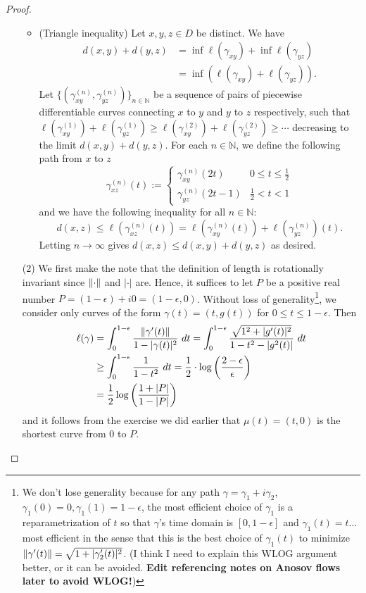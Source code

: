 \documentclass[10pt]{article}
\theoremstyle{plain}
\begin{document}
\begin{proof}
\begin{itemize}
\begin{itemize}
						\item (Triangle inequality) Let $x, y, z \in D$ be distinct. We have
							\begin{align*}
								d(x, y) + d(y, z) &= \inf \ell (\gamma_{xy}) + \inf{\ell(\gamma_{yz})} \\
								&= \inf( \ell(\gamma_{xy}) + \ell(\gamma_{yz})).
							\end{align*}
						Let $\{(\gamma_{xy}^{(n)}, \gamma_{yz}^{(n)})\}_{n \in \mathbb{N}}$ be a sequence of pairs of piecewise differentiable curves connecting $x$ to $y$ and $y$ to $z$ respectively, such that $\ell(\gamma_{xy}^{(1)}) + \ell(\gamma_{yz}^{(1)}) \geq \ell(\gamma_{xy}^{(2)}) + \ell(\gamma_{yz}^{(2)}) \geq \cdots$ decreasing to the limit $d(x, y) + d(y, z)$. For each $n \in \mathbb{N}$, we define the following path from $x$ to $z$ $$\gamma_{xz}^{(n)}(t) := \begin{cases}\gamma_{xy}^{(n)}(2t) & 0 \leq t \leq \frac{1}{2} \\ \gamma_{yz}^{(n)}(2t - 1) & \frac{1}{2} < t < 1\end{cases}$$ and we have the following inequality for all $n \in \mathbb{N}$: $$d(x, z) \leq \ell(\gamma_{xz}^{(n)}(t)) = \ell(\gamma_{xy}^{(n)}(t)) + \ell(\gamma_{yz}^{(n)})(t).$$ Letting $n \to \infty$ gives $d(x, z) \leq d(x, y) + d(y, z)$ as desired. 
					\end{itemize}
				
				\item[(2)] We first make the note that the definition of length is rotationally invariant since $\norm{\cdot}$ and $|\cdot|$ are. Hence, it suffices to let $P$ be a positive real number $P = (1 - \epsilon) + i0 = (1 - \epsilon, 0)$. Without loss of generality\footnote{We don't lose generality because for any path $\gamma = \gamma_1 + i \gamma_2$, $\gamma_1(0) = 0, \gamma_1(1) = 1 - \epsilon$, the most efficient choice of $\gamma_1$ is a reparametrization of $t$ so that $\gamma$'s time domain is $[0, 1 - \epsilon]$ and $\gamma_1(t) = t$... most efficient in the sense that this is the best choice of $\gamma_1(t)$ to minimize $\norm{\gamma'(t)} = \sqrt{1 + |\gamma_2'(t)|^2}$. (I think I need to explain this WLOG argument better, or it can be avoided. \textbf{Edit referencing notes on Anosov flows later to avoid WLOG!})}, we consider only curves of the form $\gamma(t) = (t, g(t))$ for $0 \leq t \leq 1 - \epsilon$. Then 
					\begin{align*}
						\ell(\gamma) &= \int_0^{1 - \epsilon} \frac{\norm{\gamma'(t)}}{1 - |\gamma(t)|^2} \ dt = \int_0^{1 - \epsilon} \frac{\sqrt{1^2 + |g'(t)|^2}}{1 - t^2 - |g^2(t)|} \ dt \\
						&\geq \int_0^{1 - \epsilon} \frac{1}{1 - t^2} \ dt = \frac{1}{2} \cdot \log \left(\frac{2 - \epsilon}{\epsilon}\right) \\
						&= \frac{1}{2} \log \left(\frac{1 + |P|}{1 - |P|}\right) 
					\end{align*}
				and it follows from the exercise we did earlier that $\mu(t) = (t, 0)$ is the shortest curve from $0$ to $P$. 
			\end{itemize}
		\end{proof}
	
\end{document}
